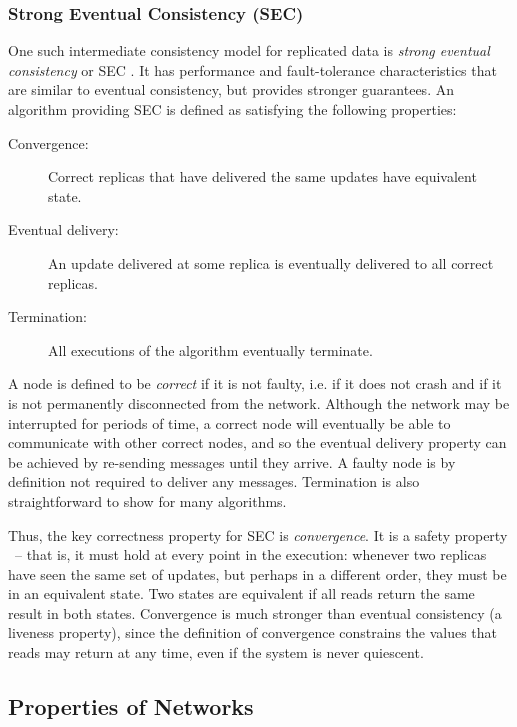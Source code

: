 \subsubsection{Strong Eventual Consistency (SEC)}

One such intermediate consistency model for replicated data is \emph{strong eventual consistency} or
SEC \cite{Shapiro:2011un}. It has performance and fault-tolerance characteristics that are similar
to eventual consistency, but provides stronger guarantees. An algorithm providing SEC is defined as
satisfying the following properties:

\begin{description}
\item[Convergence:] Correct replicas that have delivered the same updates have equivalent state.
\item[Eventual delivery:] An update delivered at some replica is eventually delivered to all correct
replicas.
\item[Termination:] All executions of the algorithm eventually terminate.
\end{description}

A node is defined to be \emph{correct} if it is not faulty, i.e. if it does not crash and if it is
not permanently disconnected from the network. Although the network may be interrupted for periods
of time, a correct node will eventually be able to communicate with other correct nodes, and so the
eventual delivery property can be achieved by re-sending messages until they arrive. A faulty node
is by definition not required to deliver any messages. Termination is also straightforward to show
for many algorithms.

Thus, the key correctness property for SEC is \emph{convergence}. It is a safety property
\cite{Alpern:1985dg}~-- that is, it must hold at every point in the execution: whenever two replicas
have seen the same set of updates, but perhaps in a different order, they must be in an equivalent
state. Two states are equivalent if all reads return the same result in both states. Convergence is
much stronger than eventual consistency (a liveness property), since the definition of convergence
constrains the values that reads may return at any time, even if the system is never quiescent.

\subsection{Properties of Networks}\label{sect.background.networks}

